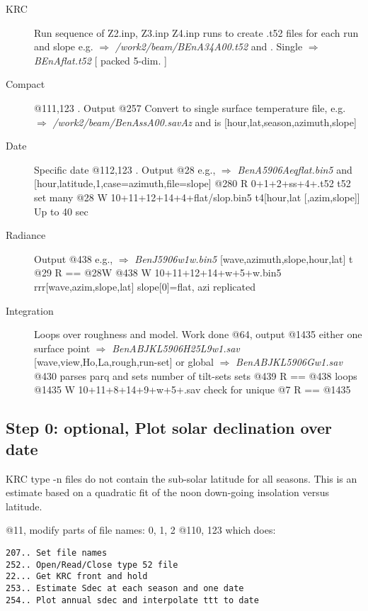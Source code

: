 \documentclass{article}
\newcommand{\qfo}[1]{$\Longrightarrow$ \textit{#1}} %
\begin{document}
\begin{description}  %
\item [KRC] Run sequence of Z2.inp, Z3.inp Z4.inp runs to create .t52 files for each run and slope
\qi e.g. \qfo{/work2/beam/BEnA34A00.t52} and .
 \qi Single \qfo{BEnAflat.t52} [ packed 5-dim. ]

\item[Compact] @111,123 . Output @257
Convert to single surface temperature file, e.g.
\qi  \qfo{/work2/beam/BenAssA00.savAz} and   is [hour,lat,season,azimuth,slope]
 
\item [Date] Specific date @112,123 . Output @28  e.g., 
\qi \qfo{BenA5906Aeqflat.bin5} and 
   [hour,latitude,1,case=azimuth,file=slope]
\qi  @280  R 0+1+2+ss+4+.t52        t52 set           many
\qi    @28  W 10+11+12+14+4+flat/slop.bin5  t4[hour,lat [,azim,slope]] 
\qi   Up to 40 sec

\item [Radiance] Output @438  e.g., \qfo{BenJ5906w1w.bin5} [wave,azimuth,slope,hour,lat] t
\qi    @29  R == @28W
\qi    @438 W 10+11+12+14+w+5+w.bin5   rrr[wave,azim,slope,lat]  slope[0]=flat, azi replicated


\item[Integration] Loops over roughness and model. Work done @64,  output @1435 
\qi either one surface point \qfo{BenABJKL5906H25L9w1.sav}  [wave,view,Ho,La,rough,run-set]
\qi  or global  \qfo{BenABJKL5906Gw1.sav} 
\\ @430 parses parq and  sets number of tilt-sets sets
\qi    @439 R == @438    loops
\qi   @1435 W  10+11+8+14+9+w+5+.sav   check for unique
\qi    @7  R == @1435


\end{description}

\subsection{Step 0: optional, Plot solar declination over date}

KRC type -n files do not contain the sub-solar latitude for all seasons. 
This is an estimate based on a quadratic fit of the noon down-going insolation versus latitude.

@11, modify parts of file names: 0, 1, 2
\qi @110, 123 which does:
\vspace{-3.mm} 
\begin{verbatim}
207.. Set file names
252.. Open/Read/Close type 52 file
22... Get KRC front and hold
253.. Estimate Sdec at each season and one date
254.. Plot annual sdec and interpolate ttt to date
\end{verbatim}
\end{document}
